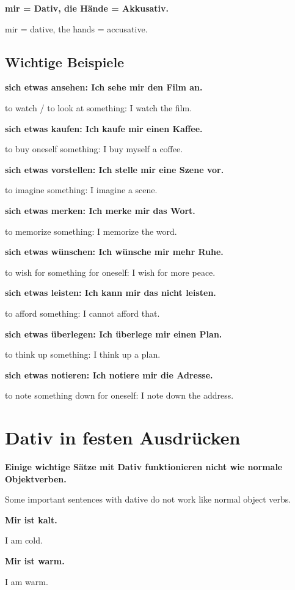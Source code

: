 \documentclass[a4paper]{article}
\newcommand{\EN}[1]{\par{\small\textcolor{TranslationGray}{#1}}\vspace{0.4em}}
\begin{document}
        \textbf{mir = Dativ, die Hände = Akkusativ.}
        \EN{mir = dative, the hands = accusative.}
        
        \subsection{Wichtige Beispiele}
            
            \textbf{sich etwas ansehen: Ich sehe mir den Film an.}
            \EN{to watch / to look at something: I watch the film.}
            
            \textbf{sich etwas kaufen: Ich kaufe mir einen Kaffee.}
            \EN{to buy oneself something: I buy myself a coffee.}
            
            \textbf{sich etwas vorstellen: Ich stelle mir eine Szene vor.}
            \EN{to imagine something: I imagine a scene.}
            
            \textbf{sich etwas merken: Ich merke mir das Wort.}
            \EN{to memorize something: I memorize the word.}
            
            \textbf{sich etwas wünschen: Ich wünsche mir mehr Ruhe.}
            \EN{to wish for something for oneself: I wish for more peace.}
            
            \textbf{sich etwas leisten: Ich kann mir das nicht leisten.}
            \EN{to afford something: I cannot afford that.}
            
            \textbf{sich etwas überlegen: Ich überlege mir einen Plan.}
            \EN{to think up something: I think up a plan.}
            
            \textbf{sich etwas notieren: Ich notiere mir die Adresse.}
            \EN{to note something down for oneself: I note down the address.}
    
    
    \section{Dativ in festen Ausdrücken}
        
        \textbf{Einige wichtige Sätze mit Dativ funktionieren nicht wie normale Objektverben.}
        \EN{Some important sentences with dative do not work like normal object verbs.}
        
        \textbf{Mir ist kalt.}
        \EN{I am cold.}
        
        \textbf{Mir ist warm.}
        \EN{I am warm.}
        
\end{document}
